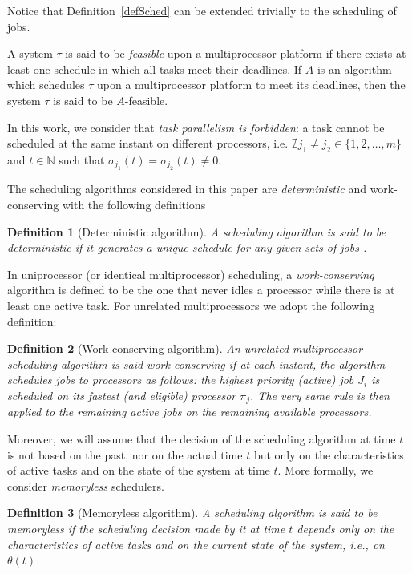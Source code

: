 \documentclass[a4paper,11pt]{article}
\newtheorem{Definition}{Definition}
\begin{document}
Notice that Definition~\ref{defSched} can be extended trivially to the
scheduling of jobs.

A system $\tau$ is said to be {\it feasible} upon a multiprocessor
platform if there exists at least one schedule in which all tasks meet
their deadlines. If $A$ is an algorithm which schedules $\tau$ upon a
multiprocessor platform to meet its deadlines, then the system $\tau$
is said to be $A$-feasible.

In this work, we consider that \emph{task parallelism is forbidden}: a task
cannot be scheduled at the same instant on different processors,
i.e. $\nexists j_1 \neq j_2 \in \{1, 2, \ldots, m \}$ and $t \in
\mathbb{N}$ such that $\sigma_{j_1}(t)= \sigma_{j_2}(t) \neq 0$.

The scheduling algorithms considered in this paper are {\em
  deterministic} and work-conserving with the following definitions

\begin{Definition}[Deterministic algorithm]\label{detAlg} 
A scheduling algorithm is said to
be \emph{deterministic} if it generates a unique schedule for any
given sets of jobs .
\end{Definition}

In uniprocessor (or identical multiprocessor) scheduling, a {\em
work-conserving} algorithm is defined to be the one that never idles a
processor while there is at least one active task. For unrelated multiprocessors
we adopt the following definition:

\begin{Definition} [Work-conserving algorithm] \label{defWorkC} 
  An unrelated multiprocessor scheduling algorithm is said
\emph{work-conserving} if at each instant, the algorithm schedules jobs
  to processors as follows: the highest priority (active) job $J_i$ is
  scheduled on its fastest (and eligible) processor $\pi_j$. The very
  same rule is then applied to the remaining active jobs on the
  remaining available processors.
\end{Definition}

Moreover, we will assume that the decision of the scheduling
algorithm at time $t$ is not based on the past, nor on the
actual time $t$ but only on the characteristics of active tasks and on
the state of the system at time $t$. More formally, we consider
\emph{memoryless} schedulers.

\begin{Definition}[Memoryless algorithm]\label{def:memoryless} 
  A scheduling algorithm is said to be \emph{memoryless} if the
  scheduling decision made by it at time $t$ depends only on the
  characteristics of active tasks and on the current state of the
  system, i.e., on $\theta(t)$.
\end{Definition}
\end{document}
